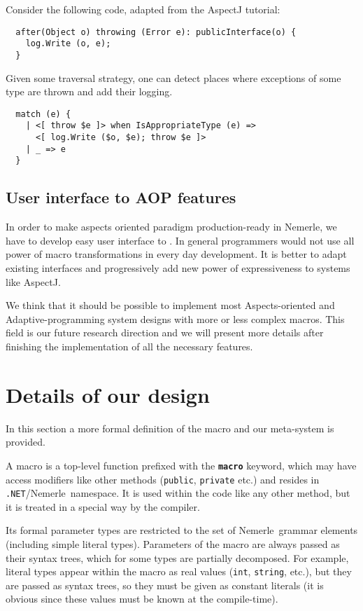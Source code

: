 \documentclass{llncs}
\newcommand{\net}[0]{{\tt .NET}}
\newcommand{\nem}[0]{Nemerle}
\newcommand{\kw}[1]{{\tt \bf #1}}
\begin{document}
Consider the following code, adapted from the AspectJ tutorial: 

\begin{verbatim}
  after(Object o) throwing (Error e): publicInterface(o) {
    log.Write (o, e);
  }
\end{verbatim}

Given some traversal strategy, one can detect places where exceptions of some
type are thrown and add their logging.

\begin{verbatim}
  match (e) {
    | <[ throw $e ]> when IsAppropriateType (e) =>
      <[ log.Write ($o, $e); throw $e ]>
    | _ => e
  }
\end{verbatim}

\subsection{User interface to AOP features}
In order to make aspects oriented paradigm production-ready in Nemerle, we have
to develop easy user interface to . In general programmers would not use all power
of macro transformations in every day development. It is better to adapt existing
interfaces and progressively add new power of expressiveness to systems like AspectJ.

We think that it should be possible to implement most Aspects-oriented
and Adaptive-programming system designs with more or less complex 
macros. This field is our future research direction and we will present
more details after finishing the implementation of all the necessary features.

\section{Details of our design}
In this section a more formal definition of the macro and our meta-system is provided.

A macro is a top-level function prefixed with the \kw{macro} keyword, 
which may have access modifiers like other methods (\verb,public,, \verb,private, etc.) 
and resides in \net/\nem\ namespace. It is used within the code like
any other method, but it is treated in a special way by the compiler.

Its formal parameter types are restricted to the set of \nem\
grammar elements (including simple literal types). Parameters of 
the macro are always passed as their syntax trees, which for some
types are partially decomposed. For example, literal types appear
within the macro as real values (\verb,int,, \verb,string,, etc.),
but they are passed
as syntax trees, so they must be given as constant literals (it is
obvious since these values must be known at the compile-time).
\end{document}
